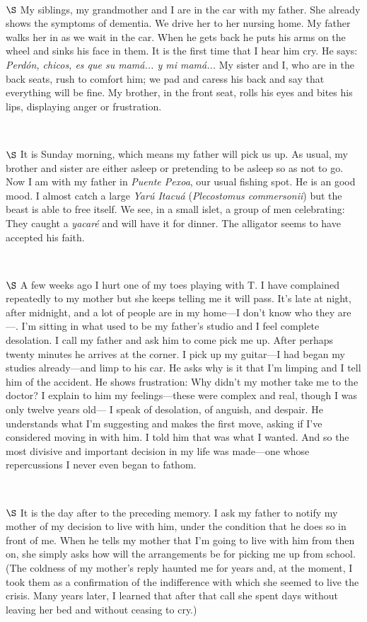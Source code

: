 \documentclass[a4paper, 12pt]{article}
\begin{document}
~ 

$\S$ My siblings, my grandmother and I are in the car with my father. She
already shows the symptoms of dementia. We drive her to her nursing home. My
father walks her in as we wait in the car. When he gets back he puts his arms
on the wheel and sinks his face in them. It is the first time that I hear
him cry. He says: \textit{Perdón, chicos, es que su mamá... y mi mamá...} My
sister and I, who are in the back seats, rush to comfort him; we pad and caress
his back and say that everything will be fine. My brother, in the front seat,
rolls his eyes and bites his lips, displaying anger or frustration.

~

$\S$ It is Sunday morning, which means my father will pick us up. As usual, my
brother and sister are either asleep or pretending to be asleep so as not to
go. Now I am with my father in \textit{Puente Pexoa}, our usual
fishing spot. He is an good mood. I almost catch a large \textit{Yarú Itacuá}
(\textit{Plecostomus commersonii}) but the beast is able to free itself. We
see, in a small islet, a group of men celebrating: They caught a
\textit{yacaré} and will have it for dinner. The alligator seems to
have accepted his faith.

~ 

$\S$ A few weeks ago I hurt one of my toes playing with T. I have complained
repeatedly to my mother but she keeps telling me it will pass. It's late at
night, after midnight, and a lot of people are in my home---I don't know who
they are---. I'm sitting in what used to be my father's studio and I feel
complete desolation. I call my father and ask him to come pick me up. After
perhaps twenty minutes he arrives at the corner. I pick up
my guitar---I had began my studies already---and limp to his car. He asks why
is it that I'm limping and I tell him of the accident. He shows frustration: Why didn't my mother take me to the doctor? I explain to him my
feelings---these were complex and real, though I was only twelve years old--- I
speak of desolation, of anguish, and despair. He understands what I'm
suggesting and makes the first move, asking if I've considered moving in with
him. I told him that was what I wanted. And so the most divisive and important
decision in my life was made---one whose repercussions I never even began to
fathom.

~ 

$\S$ It is the day after to the preceding memory. I ask my father to notify my
mother of my decision to live with him, under the condition that he does so in
front of me. When he tells my mother that I'm going to live with him from then
on, she simply asks how will the arrangements be for picking me up from school.
(The coldness of my mother's reply haunted me for years and, at the moment, I
took them as a confirmation of the indifference with which she seemed to live
the crisis. Many years later, I learned that after that call she spent days
without leaving her bed and without ceasing to cry.)
\end{document}
